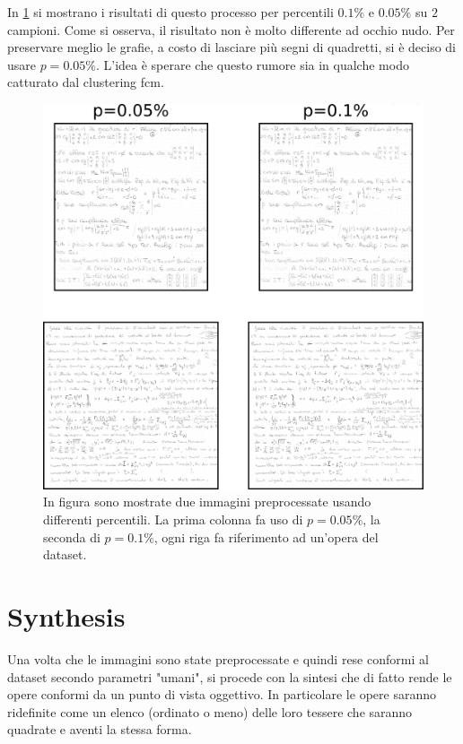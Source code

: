 \begin{toDo}
	\noindent In \cref{fig:fft_results} si mostrano i risultati di questo processo per percentili $0.1\%$ e $0.05\%$ su $2$ campioni. Come si osserva, il risultato non è molto differente ad occhio nudo. Per preservare meglio le grafie, a costo di lasciare più segni di quadretti, si è deciso di usare $p=0.05\%$. L'idea è sperare che questo rumore sia in qualche modo catturato dal clustering \gls{fcm}.

	\begin{figure}[H]
		\centering
		\includegraphics[width=1.0\linewidth]{Figures/fft_results.png}
		\caption[results of "fft cleaner"]{In figura sono mostrate due immagini preprocessate usando differenti percentili. La prima colonna fa uso di $p=0.05\%$, la seconda di $p=0.1\%$, ogni riga fa riferimento ad un'opera del dataset.}
		\label{fig:fft_results}
	\end{figure}

    \section{Synthesis}
    Una volta che le immagini sono state preprocessate e quindi rese conformi al dataset secondo parametri "umani", si procede con la sintesi che di fatto rende le opere conformi da un punto di vista oggettivo. In particolare le opere saranno ridefinite come un elenco (ordinato o meno) delle loro tessere che saranno quadrate e aventi la stessa forma.


\end{toDo}
